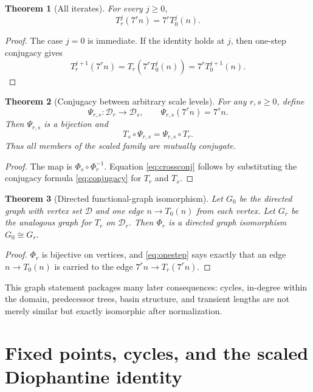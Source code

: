 \documentclass[11pt]{article}
\newtheorem{theorem}{Theorem}[section]
\begin{document}
\begin{theorem}[All iterates]
For every $j\ge0$,
\begin{equation}
T_r^j(7^rn)=7^rT_0^j(n).
\label{eq:alliterates}
\end{equation}
\end{theorem}
\begin{proof}
The case $j=0$ is immediate. If the identity holds at $j$, then one-step conjugacy gives
\[
T_r^{j+1}(7^rn)=T_r(7^rT_0^j(n))=7^rT_0^{j+1}(n).
\]
\end{proof}

\begin{theorem}[Conjugacy between arbitrary scale levels]
For any $r,s\ge0$, define
\begin{equation}
\Psi_{r,s}:\mathcal D_r\to\mathcal D_s,
\qquad
\Psi_{r,s}(7^rn)=7^sn.
\label{eq:Psi}
\end{equation}
Then $\Psi_{r,s}$ is a bijection and
\begin{equation}
T_s\circ\Psi_{r,s}=\Psi_{r,s}\circ T_r.
\label{eq:crossconj}
\end{equation}
Thus all members of the scaled family are mutually conjugate.
\end{theorem}
\begin{proof}
The map is $\Phi_s\circ\Phi_r^{-1}$. Equation \eqref{eq:crossconj} follows by substituting the conjugacy formula \eqref{eq:conjugacy} for $T_r$ and $T_s$.
\end{proof}

\begin{theorem}[Directed functional-graph isomorphism]
Let $G_0$ be the directed graph with vertex set $\mathcal D$ and one edge $n\to T_0(n)$ from each vertex. Let $G_r$ be the analogous graph for $T_r$ on $\mathcal D_r$. Then $\Phi_r$ is a directed graph isomorphism $G_0\cong G_r$.
\end{theorem}
\begin{proof}
$\Phi_r$ is bijective on vertices, and \eqref{eq:onestep} says exactly that an edge $n\to T_0(n)$ is carried to the edge $7^rn\to T_r(7^rn)$.
\end{proof}

This graph statement packages many later consequences: cycles, in-degree within the domain, predecessor trees, basin structure, and transient lengths are not merely similar but exactly isomorphic after normalization.

\section{Fixed points, cycles, and the scaled Diophantine identity}
\end{document}
